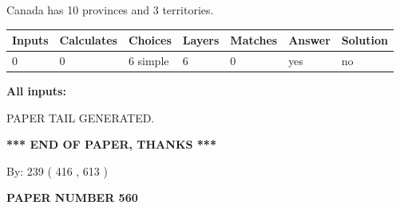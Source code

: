 \documentclass[12pt]{article}
\begin{document}
 
\noindent{}
 
 
Canada has 10  provinces and 3 territories.
 
 
\noindent{}
 
 
   
   
   
   
\noindent\begin{tabular}{|l|l|l|l|l|l|l|}
 \hline
Inputs & Calculates & Choices & Layers & Matches & Answer & Solution \\ \hline
 0  & 
 0  & 
 6
  simple  
  & 
 6  & 
 0  & 
  yes & 
  no 
  \\ \hline
 \end{tabular}
   
   
   
   
\noindent{}
   
   
   
   
\noindent\vspace{0.1in}\hspace{-0.08in} {\textbf{\Large{All inputs: }}}
   
   
   
   
   
   
 \vspace{0.2in}
 
   
   
\vspace{2.0in} PAPER TAIL GENERATED.
   
   
   
   
\vspace{1.0in} 
{\textbf{\large{ *** END OF PAPER, THANKS *** }}} 
   
   
\hspace{1.0in} By: 
 239 ( 416 ,  613 )
   
   
   
   
\newpage 
\setcounter{page}{ 
   560001 } 
   
   
   
   
 {\textbf{ \Large{ PAPER NUMBER  560  }}}
   
   
\vspace{0.2in}
   
   
   
\end{document}
